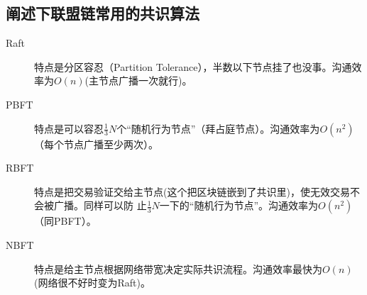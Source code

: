 \documentclass[dvipsnames]{ctexart}
\newcommand{\mycola}{MidnightBlue}
\newcommand{\cola}[1]{\textcolor{\mycola}{#1}}
\begin{document}
\subsection*{阐述下联盟链常用的共识算法}

\begin{description}
\item[Raft] 特点是分区容忍（Partition Tolerance），半数以下节点挂了也没事。沟通效率为$O(n)$(主节点广播一次就行)。
\item[PBFT] 特点是可以容忍$\frac{1}{3}N$个“随机行为节点”（拜占庭节点）。沟通效率为$O(n^2)$（每个节点广播至少两次）。
\item[RBFT] 特点是把交易验证交给主节点(这个把区块链嵌到了共识里)，使无效交易不会被广播。同样可以防
  止$\frac{1}{3}N$一下的“随机行为节点”。沟通效率为$O(n^2)$（同PBFT）。
\item[NBFT] 特点是给主节点根据网络带宽决定实际共识流程。沟通效率最快为$O(n)$ (网络很不好时变为Raft)。
\end{description}
\end{document}
